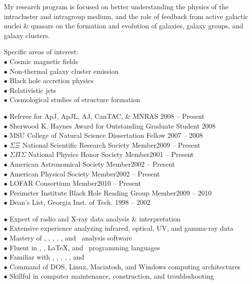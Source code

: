 \documentclass[12pt]{cv}
\newcommand{\myhead}{Cavagnolo, Curriculum Vitae}
\begin{document}
\begin{llist}
My research program is focused on better understanding the physics of
the intracluster and intragroup medium, and the role of feedback from
active galactic nuclei \& quasars on the formation and evolution of
galaxies, galaxy groups, and galaxy clusters.

Specific areas of interest:\\
$\bullet$ Cosmic magnetic fields\\
$\bullet$ Non-thermal galaxy cluster emission\\
$\bullet$ Black hole accretion physics\\
$\bullet$ Relativistic jets\\
$\bullet$ Cosmological studies of structure formation


$\bullet$ Referee for ApJ, ApJL, AJ, CanTAC, \& MNRAS \hfill 2008 -- Present\\
$\bullet$ Sherwood K. Haynes Award for Outstanding Graduate Student \hfill 2008\\
$\bullet$ MSU College of Natural Science Dissertation Fellow \hfill 2007 -- 2008\\
$\bullet$ $\Sigma \Xi$ National Scientific Research Society Member\hfill 2009 -- Present\\
$\bullet$ $\Sigma \Pi \Sigma$ National Physics Honor Society Member\hfill 2001 -- Present\\
$\bullet$ American Astronomical Society Member\hfill 2002 -- Present\\
$\bullet$ American Physical Society Member\hfill 2002 -- Present\\
$\bullet$ LOFAR Consortium Member\hfill 2010 -- Present\\
$\bullet$ Perimeter Institute Black Hole Reading Group Member\hfill 2009 -- 2010\\
$\bullet$ Dean's List, Georgia Inst. of Tech. \hfill 1998 -- 2002


$\bullet$ Expert of radio and X-ray data analysis \& interpretation\\
$\bullet$ Extensive experience analyzing infrared, optical, UV, and gamma-ray data\\
$\bullet$ Mastery of \aips, \casa, \ciao, \iraf, \osa, and \sas\ analysis software\\
$\bullet$ Fluent in \html, \idl, \LaTeX, and \perl\ programming languages\\
$\bullet$ Familiar with \clang, \fortran, \mysql, \python, \supmo, and \tickle\\
$\bullet$ Command of DOS, Linux, Macintosh, and Windows computing architectures\\
$\bullet$ Skillful in computer maintenance, construction, and troubleshooting
\markright{\myhead}


\end{llist}
\end{document}

